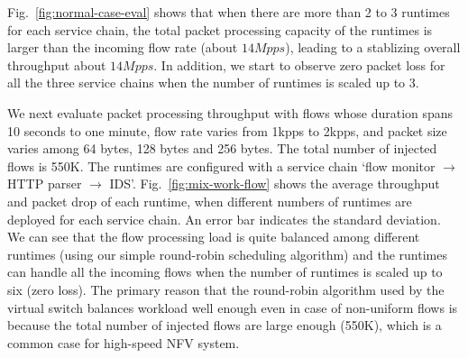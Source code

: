 

Fig.~\ref{fig:normal-case-eval} shows that %
 when there are more than 2 to 3 runtimes for each service chain, the total packet processing capacity of the runtimes is larger than the incoming flow rate (about $14Mpps$), leading to a stablizing overall throughput about $14Mpps$.  %
 In addition, we start to observe zero packet loss for all the three service chains when the number of runtimes is scaled up to 3.



 We next evaluate packet processing throughput with flows whose duration spans 10 seconds to one minute, %
flow rate varies from 1kpps to 2kpps, %
 and packet size varies among 64 bytes, 128 bytes and 256 bytes. The total number of injected flows is 550K.
 The runtimes are configured with a service chain `flow monitor $\rightarrow$ HTTP parser $\rightarrow$ IDS'. Fig.~\ref{fig:mix-work-flow} shows the average throughput and packet drop of each runtime, when different numbers of runtimes are deployed for each service chain. An error bar indicates the standard deviation. We can see that the flow processing load is quite balanced among different runtimes (using our simple round-robin scheduling algorithm) and the runtimes can handle all the incoming flows when the number of runtimes is scaled up to six (zero loss). The primary reason that the round-robin algorithm used by the virtual switch balances workload well enough even in case of non-uniform flows is because the total number of injected flows are large enough (550K), which is a common case for high-speed NFV system. 

